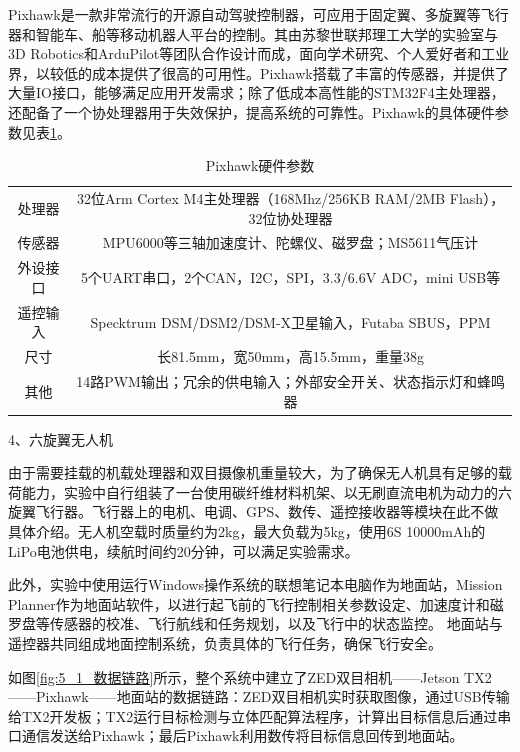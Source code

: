 Pixhawk是一款非常流行的开源自动驾驶控制器，可应用于固定翼、多旋翼等飞行器和智能车、船等移动机器人平台的控制。其由苏黎世联邦理工大学的实验室与3D Robotics和ArduPilot等团队合作设计而成，面向学术研究、个人爱好者和工业界，以较低的成本提供了很高的可用性。Pixhawk搭载了丰富的传感器，并提供了大量IO接口，能够满足应用开发需求；除了低成本高性能的STM32F4主处理器，还配备了一个协处理器用于失效保护，提高系统的可靠性。Pixhawk的具体硬件参数见表\ref{tab:5_Pixhawk}。
\begin{table}[htb] %
	\centering
	\caption{Pixhawk硬件参数}
	\label{tab:5_Pixhawk}
	\begin{small}
		\begin{tabular}{|c|c|}\hline
			处理器 & 32位Arm Cortex M4主处理器（168Mhz/256KB RAM/2MB Flash），32位协处理器 \\
			传感器 & MPU6000等三轴加速度计、陀螺仪、磁罗盘；MS5611气压计 \\
			外设接口 & 5个UART串口，2个CAN，I2C，SPI，3.3/6.6V ADC，mini USB等 \\
			遥控输入 & Specktrum DSM/DSM2/DSM-X卫星输入，Futaba SBUS，PPM \\
			尺寸 & 长81.5mm，宽50mm，高15.5mm，重量38g \\
			其他 & 14路PWM输出；冗余的供电输入；外部安全开关、状态指示灯和蜂鸣器
			\\\hline
		\end{tabular}
	\end{small}
\end{table}


4、六旋翼无人机

由于需要挂载的机载处理器和双目摄像机重量较大，为了确保无人机具有足够的载荷能力，实验中自行组装了一台使用碳纤维材料机架、以无刷直流电机为动力的六旋翼飞行器。飞行器上的电机、电调、GPS、数传、遥控接收器等模块在此不做具体介绍。无人机空载时质量约为2kg，最大负载为5kg，使用6S 10000mAh的LiPo电池供电，续航时间约20分钟，可以满足实验需求。

此外，实验中使用运行Windows操作系统的联想笔记本电脑作为地面站，Mission Planner作为地面站软件，以进行起飞前的飞行控制相关参数设定、加速度计和磁罗盘等传感器的校准、飞行航线和任务规划，以及飞行中的状态监控。
地面站与遥控器共同组成地面控制系统，负责具体的飞行任务，确保飞行安全。

如图\ref{fig:5_1_数据链路}所示，整个系统中建立了ZED双目相机——Jetson TX2——Pixhawk——地面站的数据链路：ZED双目相机实时获取图像，通过USB传输给TX2开发板；TX2运行目标检测与立体匹配算法程序，计算出目标信息后通过串口通信发送给Pixhawk；最后Pixhawk利用数传将目标信息回传到地面站。

